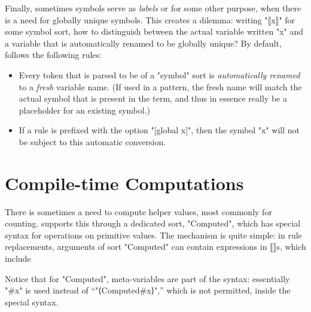 \documentclass[12pt]{article} %
\begin{document}
Finally, sometimes symbols serve as \emph{labels} or for some other purpose, when there is a need
for globally unique symbols. This creates a dilemma: writing "⟦x⟧" for some symbol sort, how to
distinguish between the actual variable written "x" and a variable that is automatically renamed to
be globally unique? By default, \HAX follows the following rules:
\begin{itemize}

\item Every token that is parsed to be of a "symbol" sort is \emph{automatically renamed} to a
  \emph{fresh} variable name. (If used in a pattern, the fresh name will match the actual symbol
  that is present in the term, and thus in essence really be a placeholder for an existing symbol.)

\item If a rule is prefixed with the option "[global x]", then the symbol "x" will not be subject to
  this automatic conversion.

\end{itemize}


\section{Compile-time Computations}
\label{sec:comp}

There is sometimes a need to compute helper values, most commonly for counting. \HAX supports this
through a dedicated sort, "Computed", which has special syntax for operations on primitive values.
The mechanism is quite simple: in rule replacements, arguments of sort "Computed" can contain
expressions in ⟦⟧s, which include
Notice that for "Computed", meta-variables are part of the syntax: essentially "#x" is used instead
of ``"⟨Computed#x⟩",'' which is not permitted, inside the special syntax.
\end{document}
